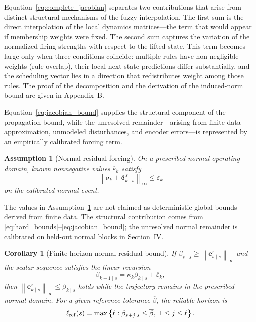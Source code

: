 \documentclass[journal]{IEEEtran}
\newtheorem{assumption}{Assumption}
\newtheorem{corollary}{Corollary}
\newcommand{\norm}[1]{\left\lVert #1\right\rVert}
\newcommand{\1}{\bm 1}
\begin{document}
Equation~\eqref{eq:complete_jacobian} separates two contributions that arise
from distinct structural mechanisms of the fuzzy interpolation. The first sum
is the direct interpolation of the local dynamics matrices---the term that
would appear if membership weights were fixed. The second sum captures the
variation of the normalized firing strengths with respect to the lifted state.
This term becomes large only when three conditions coincide: multiple rules
have non-negligible weights (rule overlap), their local next-state
predictions differ substantially, and the scheduling vector lies in a
direction that redistributes weight among those rules. The proof of the
decomposition and the derivation of the induced-norm bound are given in
Appendix~B.

Equation~\eqref{eq:jacobian_bound} supplies the structural component of the
propagation bound, while the unresolved remainder---arising from finite-data
approximation, unmodeled disturbances, and encoder errors---is represented by
an empirically calibrated forcing term.

\begin{assumption}[Normal residual forcing]
\label{ass:normal}
On a prescribed normal operating domain, known nonnegative values
$\overline{\varepsilon}_k$ satisfy
\begin{equation}
\norm{\bm\nu_k+\bm\delta_{k\mid s}^{\chi}}_\infty
\leq\overline{\varepsilon}_k
\label{eq:forcing_bound}
\end{equation}
on the calibrated normal event.
\end{assumption}

The values in Assumption~\ref{ass:normal} are not claimed as deterministic
global bounds derived from finite data. The structural contribution comes from
\eqref{eq:hard_bounds}--\eqref{eq:jacobian_bound}; the unresolved normal
remainder is calibrated on held-out normal blocks in Section~IV.

\begin{corollary}[Finite-horizon normal residual bound]
\label{cor:bound}
If $\beta_{s\mid s}\geq\norm{\bm e_{s\mid s}^z}_\infty$ and the scalar
sequence satisfies the linear recursion
\begin{equation}
\beta_{k+1\mid s}=\kappa_k\beta_{k\mid s}
+\overline{\varepsilon}_k,
\label{eq:beta_recursion}
\end{equation}
then $\norm{\bm e_{k\mid s}^z}_\infty\leq\beta_{k\mid s}$ holds while the
trajectory remains in the prescribed normal domain. For a given reference
tolerance $\overline{\beta}$, the reliable horizon is
\begin{equation}
\ell_{\rm ref}(s)=
\max\left\{\ell:\beta_{s+j\mid s}\leq\overline{\beta},
\ 1\leq j\leq\ell\right\}.
\label{eq:reliable_horizon}
\end{equation}
\end{corollary}
\end{document}

